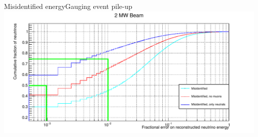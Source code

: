 \documentclass[]{beamer}
\begin{document}
\begin{frame}{Misidentified energy}{Gauging event pile-up}
	\centering
	\includegraphics[width=\textwidth]{defence/misid_rel_y}
\end{frame}
\end{document}
